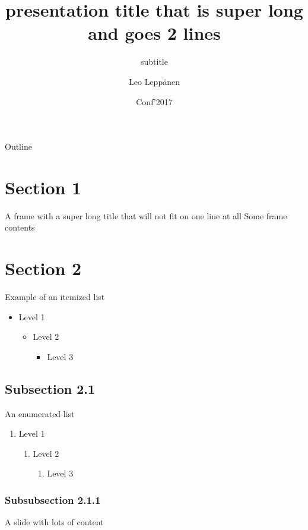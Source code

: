 \documentclass[12pt, t]{beamer}
\title{presentation title that is super long and goes 2 lines}
\subtitle{subtitle}
\author[Leppänen et al.]{Leo Leppänen}
\institute{Department of Computer Science}
\date{Conf'2017}
\begin{document}
\maketitle

\begin{frame}{Outline}
    \begin{center}
        \tableofcontents[hideallsubsections]
    \end{center}
\end{frame}


\section{Section 1}

\begin{frame}{A frame with a super long title that will not fit on one line at all}
    Some frame contents
\end{frame}

\section{Section 2}

\begin{frame}{Example of an itemized list}
    \begin{itemize}
        \item Level 1
        \begin{itemize}
            \item Level 2
            \begin{itemize}
                \item Level 3
            \end{itemize}
        \end{itemize}
    \end{itemize}
\end{frame}

\subsection{Subsection 2.1}

\begin{frame}{An enumerated list}
    \begin{enumerate}
        \item Level 1
        \begin{enumerate}
            \item Level 2
            \begin{enumerate}
                \item Level 3
            \end{enumerate}
        \end{enumerate}
    \end{enumerate}
\end{frame}

\subsubsection{Subsubsection 2.1.1}

\begin{frame}{A slide with lots of content}
    \lipsum[2]
\end{frame}
\end{document}
